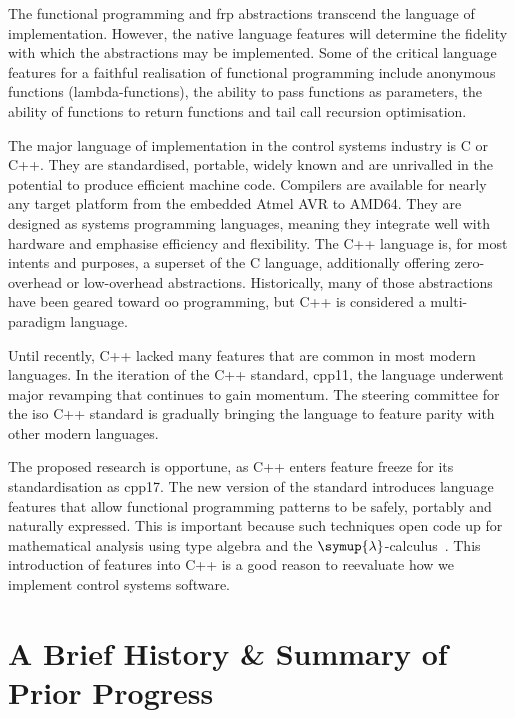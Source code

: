 The functional programming and \ac{frp} abstractions transcend the language of
implementation. However, the native language features will determine the
fidelity with which the abstractions may be implemented. Some of the critical
language features for a faithful realisation of functional programming include
anonymous functions (lambda-functions), the ability to pass functions as
parameters, the ability of functions to return functions and tail call recursion
optimisation.

 The major language of implementation in the
control systems industry is C or C++. They are standardised, portable, widely
known and are unrivalled in the potential to produce efficient machine code.
Compilers are available for nearly any target platform from the embedded Atmel
AVR to AMD64. They are designed as systems programming languages, meaning they
integrate well with hardware and emphasise efficiency and flexibility. The C++
language is, for most intents and purposes, a superset of the C language,
additionally offering zero-overhead or low-overhead abstractions. Historically,
many of those abstractions have been geared toward \ac{oo} programming, but C++
is considered a multi-paradigm language.

Until recently, C++ lacked many features that are common in most modern
languages. In the  iteration of the C++ standard, \ac{cpp11}, the
language underwent major revamping that continues to gain momentum. The steering
committee for the \ac{iso} C++ standard is gradually bringing the language to
feature parity with other modern languages.

The proposed research is opportune, as C++ enters feature freeze for its
 standardisation as \ac{cpp17}. The new version of the standard
introduces language features that allow functional programming patterns to be
safely, portably and naturally expressed. This is important because such
techniques open code up for mathematical analysis using type algebra and the
$\symup{\lambda}$-calculus~\cite{Church1941}. This
introduction of features into C++ is a good reason to reevaluate how we
implement control systems software.



\section{A Brief History \& Summary of Prior Progress}%
\label{sec:historyANDprogress}


